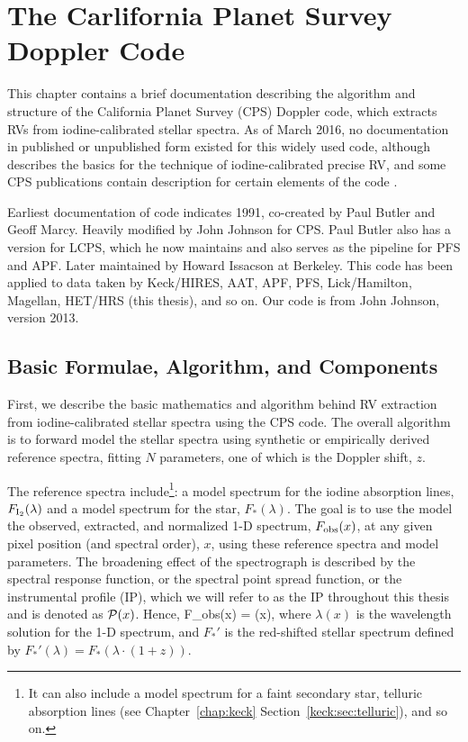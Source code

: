 \chapter{The Carlifornia Planet Survey Doppler Code}\label{chap:doppler}

This chapter contains a brief documentation describing the algorithm
and structure of the California Planet Survey (CPS) Doppler code,
which extracts RVs from iodine-calibrated stellar spectra. As of March
2016, no documentation in published or unpublished form existed for
this widely used code, although \cite{butler1996} describes the basics
for the technique of iodine-calibrated precise RV, and some CPS
publications contain description for certain elements of the code
\citep[e.g.,][]{2006ApJ...647..600J, 2009ApJ...696...75H, 2011ApJ...726...73H,
  2011ApJS..197...26J}.

Earliest documentation of code indicates 1991, co-created by Paul
Butler and Geoff Marcy. Heavily modified by John Johnson for CPS. Paul
Butler also has a version for LCPS, which he now maintains and also
serves as the pipeline for PFS and APF. Later maintained by Howard
Issacson at Berkeley. This code has been applied to data taken by
Keck/HIRES, AAT, APF, PFS, Lick/Hamilton, Magellan, HET/HRS (this
thesis), and so on. Our code is from John Johnson, version 2013.


\section{Basic Formulae, Algorithm, and Components}

First, we describe the basic mathematics and algorithm behind RV
extraction from iodine-calibrated stellar spectra using the CPS
code. The overall algorithm is to forward model the stellar spectra
using synthetic or empirically derived reference spectra, fitting $N$
parameters, one of which is the Doppler shift, $z$.

The reference spectra include\footnote{It can also include a model
  spectrum for a faint secondary star, telluric absorption lines (see
  Chapter~\ref{chap:keck} Section~\ref{keck:sec:telluric}), and so
  on.}: a model spectrum for the iodine absorption lines, $F_{\rm
  I_2}(\lambda)$ and a model spectrum for the star,
$F_{*}(\lambda)$. The goal is to use the model the observed,
extracted, and normalized 1-D spectrum, $F_{\rm obs}(x)$, at any given
pixel position (and spectral order), $x$, using these reference spectra
and model parameters. The broadening effect of the spectrograph is
described by the spectral response function, or the spectral point
spread function, or the instrumental profile (IP), which we will refer
to as the IP throughout this thesis and is denoted as
$\mathcal{P}(x)$. Hence,
\beq
F_{\rm obs}(x) =  \ast \curlyp(x),
\eeq
where $\lambda(x)$ is the wavelength solution for the 1-D spectrum,
and $F_{*}'$ is the red-shifted stellar spectrum defined by
$F_{*}'(\lambda) = F_{*}(\lambda\cdot(1+z))$.

